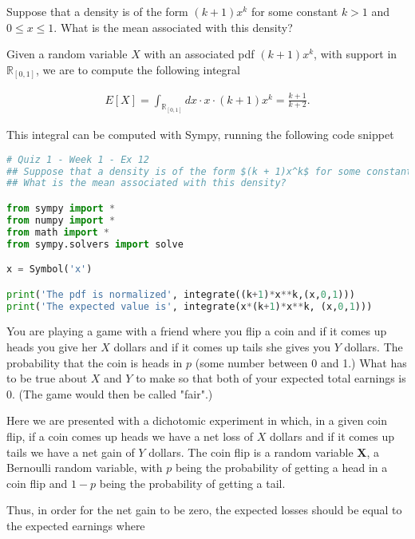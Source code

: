 \documentclass{homework}
\begin{document}
\begin{tcolorbox}[title=Question 12]
Suppose that a density is of the form $(k + 1)x^k$
for some constant $k > 1$ and $0 \leq x \leq 1$. What is the mean associated with this density?
\end{tcolorbox}

Given a random variable $X$ with an associated pdf $(k+1)x^k$, with support in $\mathds{R}_{[0,1]}$, we are to compute the following integral

\begin{align*}
E[X] = \int_{\mathds{R}_{[0,1]}} dx \cdot x \cdot(k + 1)x^k = \frac{k+1}{k+2}.     
\end{align*}

This integral can be computed with Sympy, running the following code snippet 

\begin{lstlisting}[language=Python]
# Quiz 1 - Week 1 - Ex 12
## Suppose that a density is of the form $(k + 1)x^k$ for some constant $k > 1$ and $0 \leq x \leq 1$. 
## What is the mean associated with this density?

from sympy import *
from numpy import *
from math import *
from sympy.solvers import solve

x = Symbol('x')

print('The pdf is normalized', integrate((k+1)*x**k,(x,0,1)))
print('The expected value is', integrate(x*(k+1)*x**k, (x,0,1)))
\end{lstlisting}

\begin{tcolorbox}[title=Question 13]
You are playing a game with a friend where you flip a coin and if it comes up heads you give her $X$ dollars and if it comes up tails she gives you $Y$ dollars. The probability that the coin is heads in $p$ (some number between 0 and 1.)  What has to be true about $X$ and $Y$ to make so that both of your expected total earnings is 0. (The game would then be called "fair".)
\end{tcolorbox}

Here we are presented with a dichotomic experiment in which, in a given coin flip, if a coin comes up heads we have a net loss of $X$ dollars and if it comes up tails we have a net gain of $Y$ dollars. The coin flip is a random variable $\mathbf{X}$, a Bernoulli random variable, with $p$ being the probability of getting a head in a coin flip and $1-p$ being the probability of getting a tail.

Thus, in order for the net gain to be zero, the expected losses should be equal to the expected earnings where 
\end{document}
